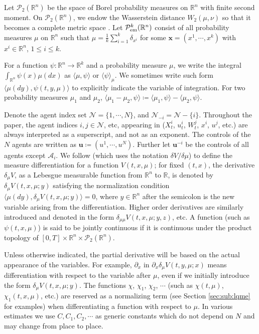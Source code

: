 \documentclass{amsart}
\theoremstyle{definition}
\theoremstyle{remark}
\def\cal{\mathcal}
\def\la{\langle}
\def\ra{\rangle}
\numberwithin{equation}{section}
\begin{document}
Let ${\cal P}_2({\mathbb R}^n)$ be the space of Borel probability measures
on ${\mathbb R}^n$ with finite second moment.
 On ${\cal P}_2({\mathbb R}^n)$, we endow the Wasserstein distance $W_2(\mu, \nu)$
 so that it becomes a complete metric space \cite{AGS05}.
 Let ${\mathcal P}_{\rm em}^k(\mathbb{R}^n)$ consist of all probability measures $\mu$ on $\mathbb{R}^n$ such that $\mu=\frac{1}{k}\sum_{i=1}^k{\delta_{{x}^i}}$ for some ${\mathbf x}=(x^1, \cdots, x^k) $ with ${ x}^i\in \mathbb{R}^n$, $1\le i\le k$.

For  a function $\psi:\mathbb{R}^n\to \mathbb{R}^k$ and a probability measure $\mu$, we write the integral $\int_{\mathbb{R}^n} \psi (x) \mu (dx) $ as  $ \la\mu ,\psi \ra $ or $\la \psi\ra_\mu$. We sometimes  write such form $\langle \mu(dy), \psi(t,y,\mu) \rangle$ to explicitly indicate the variable of integration.
  For two probability measures $\mu_1$ and $\mu_2$, $\la \mu_1-\mu_2, \psi \ra \coloneqq  \la\mu_1 ,\psi \ra - \la\mu_2 ,\psi \ra$.





Denote the agent index set ${\mathcal N}=\{1, \cdots, N\}$, and ${\mathcal N}_{-i}={\mathcal N}-\{i\}$. Throughout the paper, the agent indices $i, j\in {\mathcal N}$, etc, appearing in ($X^i_t$, $u_t^i$, $W_t^j$, $x^i$, $u^j$, etc.)  are always interpreted as a superscript, and not as an exponent.
The controls of the $N$ agents are written as ${\mathbf u}\coloneqq (u^1, \cdots, u^N).$ Further let ${\mathbf u}^{-i}$ be the controls of all agents except ${\mathcal A}_i$.
We follow \cite{CDLL19} (which uses the notation $\delta V/\delta \mu$) to define the measure differentiation for a function $V(t, x, \mu)$; for  fixed $(t, x)$, the derivative $\delta_\mu V$, as a Lebesgue measurable function from $\mathbb{R}^n$ to $\mathbb{R}$, is denoted by $\delta_\mu V(t, x, \mu; y)$ satisfying the normalization condition
$\langle \mu(dy), \delta_\mu V(t,x,\mu;y) \rangle=0  $, where $y\in \mathbb{R}^n$ after the semicolon  is the new variable arising from the differentiation. Higher order derivatives are similarly introduced and denoted in the form $\delta_{\mu\mu} V(t, x, \mu; y,z)$, etc. A function (such as $\psi(t,x,\mu)$) is said to be jointly continuous if it is continuous under the product topology of $[0,T]\times \mathbb{R}^n \times {\cal P}_2(\mathbb{R}^n)$.

Unless otherwise indicated, the partial derivative will be based on the actual appearance of the variables. For example, $\partial_x$  in  $\partial_x \delta_\mu V(t, y, \mu; x)$ means differentiation with respect to the variable after $\mu$, even if we initially introduce the form $\delta_\mu V(t, x, \mu; y)$. The functions $\chi$,  $\chi_1$, $\chi_2$, $\cdots$ (such as $\chi(t,\mu)$, $\chi_1(t,x,\mu)$, etc.) are reserved as a normalizing term (see Section \ref{sec:sub:lqme} for examples) when differentiating a function with respect to $\mu$. In various estimates we use $C, C_1, C_2, \cdots$
as generic constants which do not depend on $N$ and may change from place to place.
\end{document}
